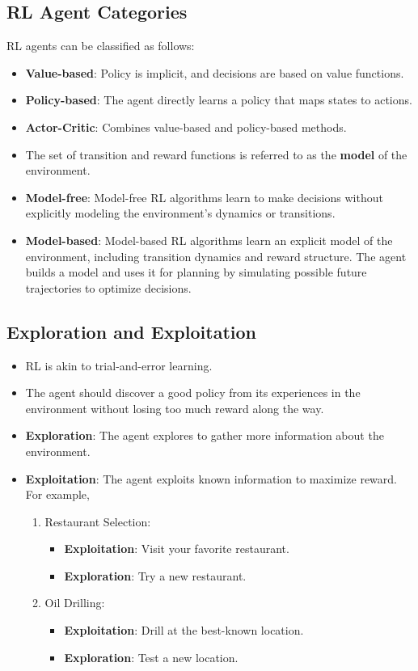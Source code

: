 \subsection{RL Agent Categories}
RL agents can be classified as follows:
\begin{itemize}
    \item \textbf{Value-based}: Policy is implicit, and decisions are based on value functions.
    \item \textbf{Policy-based}: The agent directly learns a policy that maps states to actions.
    \item \textbf{Actor-Critic}: Combines value-based and policy-based methods.
    \item The set of transition and reward functions is referred to as the \textbf{model} of the environment.
    \item \textbf{Model-free}: Model-free RL algorithms learn to make decisions without explicitly modeling the environment's dynamics or transitions.
    \item \textbf{Model-based}: Model-based RL algorithms learn an explicit model of the environment, including transition dynamics and reward structure. The agent builds a model and uses it for planning by simulating possible future trajectories to optimize decisions.
\end{itemize}

\subsection{Exploration and Exploitation}
\begin{itemize}
    \item RL is akin to trial-and-error learning.
    \item The agent should discover a good policy from its experiences in the environment without losing too much reward along the way.
    \item \textbf{Exploration}: The agent explores to gather more information about the environment.
    \item \textbf{Exploitation}: The agent exploits known information to maximize reward. For example,
    \begin{enumerate}
        \item Restaurant Selection:
        \begin{itemize}
            \item \textbf{Exploitation}: Visit your favorite restaurant.
            \item \textbf{Exploration}: Try a new restaurant.
        \end{itemize}
        \item Oil Drilling:
        \begin{itemize}
            \item \textbf{Exploitation}: Drill at the best-known location.
            \item \textbf{Exploration}: Test a new location.
        \end{itemize}
    \end{enumerate}
\end{itemize}

